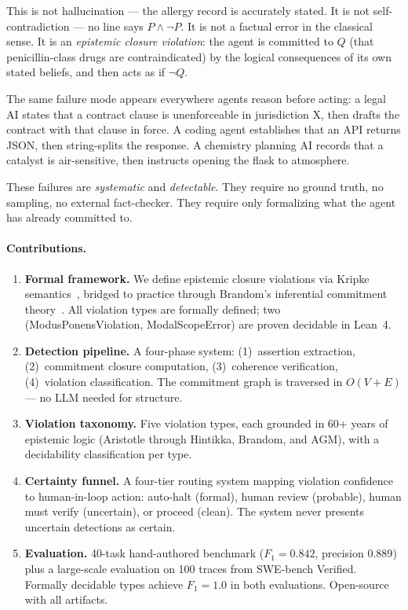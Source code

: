 \documentclass[11pt]{article}
\begin{document}
This is not hallucination — the allergy record is accurately stated.
It is not self-contradiction — no line says $P \wedge \neg P$.
It is not a factual error in the classical sense.
It is an \emph{epistemic closure violation}: the agent is committed to $Q$
(that penicillin-class drugs are contraindicated) by the logical consequences
of its own stated beliefs, and then acts as if $\neg Q$.

The same failure mode appears everywhere agents reason before acting:
a legal AI states that a contract clause is unenforceable in jurisdiction X,
then drafts the contract with that clause in force.
A coding agent establishes that an API returns JSON, then string-splits the response.
A chemistry planning AI records that a catalyst is air-sensitive, then
instructs opening the flask to atmosphere.

These failures are \emph{systematic} and \emph{detectable}.
They require no ground truth, no sampling, no external fact-checker.
They require only formalizing what the agent has already committed to.

\paragraph{Contributions.}
\begin{enumerate}
  \item \textbf{Formal framework.} We define epistemic closure violations
    via Kripke semantics~\citep{kripke1963,hintikka1962}, bridged to
    practice through Brandom's inferential commitment
    theory~\citep{brandom1994}. All violation types are formally defined;
    two (ModusPonensViolation, ModalScopeError) are proven decidable in
    Lean~4.

  \item \textbf{Detection pipeline.} A four-phase system:
    (1)~assertion extraction, (2)~commitment closure computation,
    (3)~coherence verification, (4)~violation classification.
    The commitment graph is traversed in $O(V+E)$ — no LLM needed for
    structure.

  \item \textbf{Violation taxonomy.} Five violation types, each grounded in
    60+ years of epistemic logic (Aristotle through Hintikka, Brandom,
    and AGM), with a decidability classification per type.

  \item \textbf{Certainty funnel.} A four-tier routing system mapping
    violation confidence to human-in-loop action: auto-halt (formal),
    human review (probable), human must verify (uncertain), or proceed
    (clean). The system never presents uncertain detections as certain.

  \item \textbf{Evaluation.} 40-task hand-authored benchmark ($F_1 = 0.842$,
    precision $0.889$) plus a large-scale evaluation on 100 traces from
    SWE-bench Verified. Formally decidable types achieve $F_1 = 1.0$
    in both evaluations. Open-source with all artifacts.
\end{enumerate}
\end{document}
